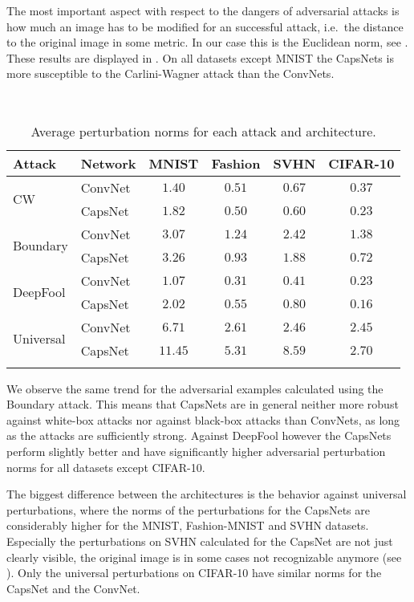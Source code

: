 The most important aspect with respect to the dangers of adversarial attacks is how much an image has to be modified for an successful attack, i.e.\ the distance to the original image in some metric.
In our case this is the Euclidean norm, see .
These results are displayed in .
On all datasets except MNIST the CapsNets is more susceptible to the Carlini-Wagner attack than the ConvNets.

\begin{table}
	\centering\
	\begin{tabular}{llcccc}
		\toprule
		Attack & Network       & MNIST & Fashion & SVHN & CIFAR-10  \\
		\midrule
		\multirow{2}{*}{CW} & ConvNet & {$1.40$} & $0.51$ & $0.67$ & $0.37$ \\
		& CapsNet            & $1.82$ & {$0.50$} & {$0.60$} & {$0.23$} \\
		\midrule
		\multirow{2}{*}{Boundary} & ConvNet & {$3.07$} & $1.24$ & $2.42$ & $1.38$ \\
		& CapsNet            & $3.26$ & {$0.93$} & {$1.88$} & {$0.72$} \\
		\midrule
		\multirow{2}{*}{DeepFool} & ConvNet & {$1.07$} & {$0.31$} & {$0.41$} & $0.23$ \\
		& CapsNet           & $2.02$ & $0.55$ & $0.80$ & {$0.16$} \\
		\midrule
		\multirow{2}{*}{Universal} & ConvNet & {$6.71$} & {$2.61$} & {$2.46$} & {$2.45$} \\
		& CapsNet           & $11.45$ & $5.31$ & $8.59$ & $2.70$ \\
		\bottomrule\\
	\end{tabular}
	\caption[Average perturbation norms]{Average perturbation norms for each attack and architecture.}
	\label{tab:norms}
\end{table}

We observe the same trend for the adversarial examples calculated using the Boundary attack.
This means that CapsNets are in general neither more robust against white-box attacks nor against black-box attacks than ConvNets, as long as the attacks are sufficiently strong.
Against DeepFool however the CapsNets perform slightly better and have significantly higher adversarial perturbation norms for all datasets except CIFAR-10.

The biggest difference between the architectures is the behavior against universal perturbations, where the norms of the perturbations for the CapsNets are considerably higher for the MNIST, Fashion-MNIST and SVHN datasets. Especially the perturbations on SVHN calculated for the CapsNet are not just clearly visible, the original image is in some cases not recognizable anymore (see ).
Only the universal perturbations on CIFAR-10 have similar norms for the CapsNet and the ConvNet.

